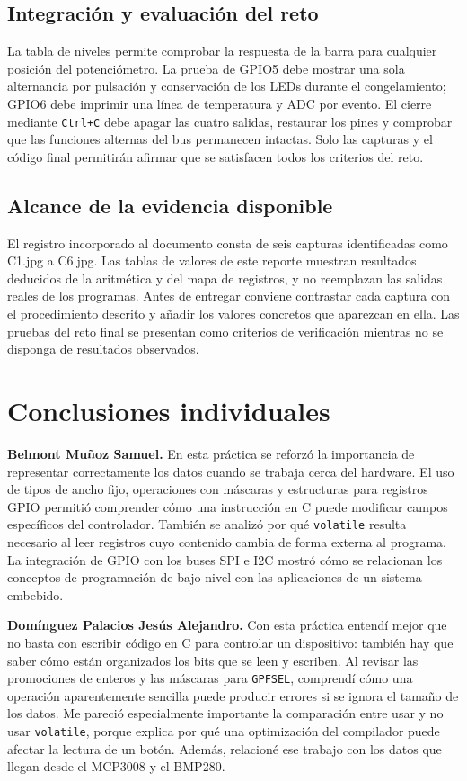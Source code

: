 \documentclass[conference]{IEEEtran}
\begin{document}
\subsection{Integración y evaluación del reto}
La tabla de niveles permite comprobar la respuesta de la barra para cualquier posición del potenciómetro. La prueba de GPIO5 debe mostrar una sola alternancia por pulsación y conservación de los LEDs durante el congelamiento; GPIO6 debe imprimir una línea de temperatura y ADC por evento. El cierre mediante \texttt{Ctrl+C} debe apagar las cuatro salidas, restaurar los pines y comprobar que las funciones alternas del bus permanecen intactas. Solo las capturas y el código final permitirán afirmar que se satisfacen todos los criterios del reto.

\subsection{Alcance de la evidencia disponible}
El registro incorporado al documento consta de seis capturas identificadas como C1.jpg a C6.jpg. Las tablas de valores de este reporte muestran resultados deducidos de la aritmética y del mapa de registros, y no reemplazan las salidas reales de los programas. Antes de entregar conviene contrastar cada captura con el procedimiento descrito y añadir los valores concretos que aparezcan en ella. Las pruebas del reto final se presentan como criterios de verificación mientras no se disponga de resultados observados.

\section{Conclusiones individuales}
\textbf{Belmont Muñoz Samuel.} En esta práctica se reforzó la importancia de representar correctamente los datos cuando se trabaja cerca del hardware. El uso de tipos de ancho fijo, operaciones con máscaras y estructuras para registros GPIO permitió comprender cómo una instrucción en C puede modificar campos específicos del controlador. También se analizó por qué \texttt{volatile} resulta necesario al leer registros cuyo contenido cambia de forma externa al programa. La integración de GPIO con los buses SPI e I2C mostró cómo se relacionan los conceptos de programación de bajo nivel con las aplicaciones de un sistema embebido.

\textbf{Domínguez Palacios Jesús Alejandro.} Con esta práctica entendí mejor que no basta con escribir código en C para controlar un dispositivo: también hay que saber cómo están organizados los bits que se leen y escriben. Al revisar las promociones de enteros y las máscaras para \texttt{GPFSEL}, comprendí cómo una operación aparentemente sencilla puede producir errores si se ignora el tamaño de los datos. Me pareció especialmente importante la comparación entre usar y no usar \texttt{volatile}, porque explica por qué una optimización del compilador puede afectar la lectura de un botón. Además, relacioné ese trabajo con los datos que llegan desde el MCP3008 y el BMP280.
\end{document}
